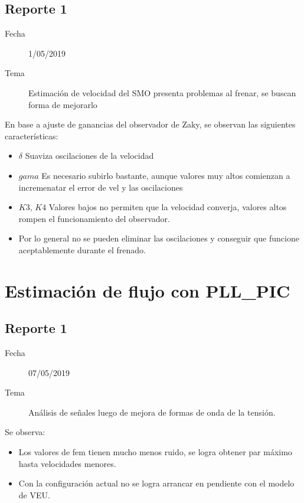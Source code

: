 \documentclass{article}
\begin{document}
		\subsection{Reporte 1}
			\begin{description}
				\item[Fecha]  1/05/2019 
				\item[Tema] Estimación de velocidad del SMO presenta problemas al frenar, se buscan forma de mejorarlo
			\end{description}
		
			En base a ajuste de ganancias del observador de Zaky, se observan las siguientes características:
			
			\begin{itemize}
				\item $\delta$ Suaviza oscilaciones de la velocidad
				\item $gama$ Es necesario subirlo bastante, aunque valores muy altos comienzan a incremenatar el error de vel y las oscilaciones
				\item $K3,\,K4$ Valores bajos no permiten que la velocidad converja, valores altos rompen el funcionamiento del observador.
				\item Por lo general no se pueden eliminar las oscilaciones y conseguir que funcione aceptablemente durante el frenado. 
			\end{itemize}
	
	
	\section{Estimación de flujo con PLL\_PIC}
	
	
		\subsection{Reporte 1}
			\begin{description}
				\item[Fecha]  07/05/2019 
				\item[Tema] Análisis de señales luego de mejora de formas de onda de la tensión.
			\end{description}
		
			Se observa:
			\begin{itemize}
				\item Los valores de fem tienen mucho menos ruido, se logra obtener par máximo hasta velocidades menores.
				\item Con la configuración actual no se logra arrancar en pendiente con el modelo de VEU.
			\end{itemize}
	
\end{document}
